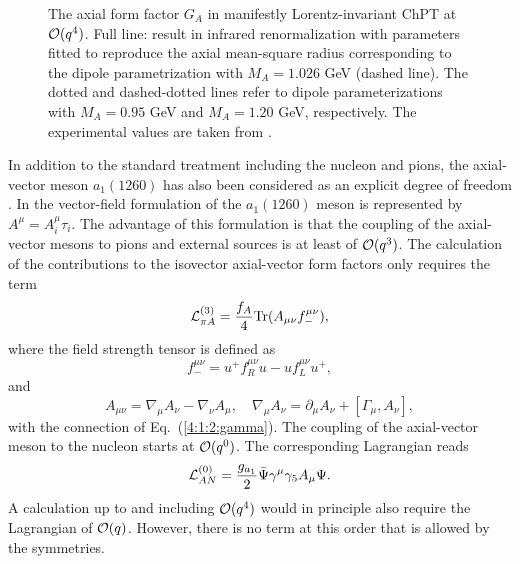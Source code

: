 \documentclass[twoside,12pt]{article}
\begin{document}
\begin{figure}[t]
\begin{center}
\caption{\label{GAwithout}
The axial form factor $G_A$ in manifestly Lorentz-invariant ChPT
at ${\cal O}(q^4)$. Full line: result in infrared renormalization with
parameters fitted to reproduce the axial mean-square radius corresponding
to the dipole parametrization with $M_A=1.026$ GeV (dashed line).
  The dotted and dashed-dotted lines refer to dipole parameterizations
with $M_A=0.95$ GeV and $M_A=1.20$ GeV, respectively.
   The experimental values are
taken from \cite{Bernard:2001rs}.}
\end{center}
\end{figure}


   In addition to the standard treatment including the
nucleon and pions, the axial-vector meson $a_1(1260)$ has also been
considered as an explicit degree of freedom \cite{Schindler:2006it}.
   In the vector-field formulation of \cite{Ecker:1989yg} the
$a_1(1260)$ meson is represented by $A^\mu=A^\mu_i \tau_i$.
   The advantage of this formulation is that the coupling of the axial-vector
mesons to pions and external sources is at least of ${\cal O}(q^3)$.
   The calculation of the contributions to the isovector axial-vector
form factors only requires the term
\begin{equation}
\label{LagAVMmeson}
{\cal L}_{{\pi}A}^{(3)} = \frac{f_A}{4}\mbox{Tr}(A_{\mu\nu}f^{\mu\nu}_{-}),
\end{equation}
where the field strength tensor is defined as
\begin{displaymath}
f_-^{\mu\nu}=u^+f_R^{\mu\nu}u-u f_L^{\mu\nu} u^+,
\end{displaymath}
and
\begin{displaymath}
A_{\mu\nu}=\nabla_\mu A_\nu-\nabla_\nu A_\mu,
\quad\nabla_\mu A_\nu=\partial_\mu A_\nu+[\Gamma_\mu,A_\nu],
\end{displaymath}
with the connection of Eq.~(\ref{4:1:2:gamma}).
   The coupling of the axial-vector meson to the nucleon starts at
${\cal O}(q^0)$.
   The corresponding Lagrangian reads
\begin{equation}
\label{LagAVMNuc}
{\cal L}_{AN}^{(0)} = \frac{g_{a_1}}{2} \bar{\Psi} \gamma^{\mu}\gamma_5 A_\mu \Psi.
\end{equation}
   A calculation up to and including ${\cal O}(q^4)$ would in principle
also require the Lagrangian of ${\cal O}(q)$.
   However, there is no term at this order that is allowed by the symmetries.
\end{document}
